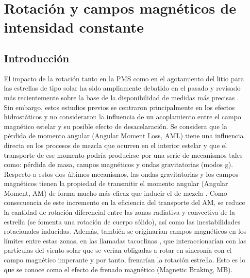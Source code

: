 
\chapter{Rotación y campos magnéticos de intensidad constante}\label{ch:tercer-capitulo}

\section{Introducción}

El impacto de la rotación tanto en la PMS como en el agotamiento del litio para las estrellas de tipo solar ha sido ampliamente debatido en el pasado \citep{Pinsonneault1997,Jeffries2004,Somers2014} y revisado más recientemente sobre la base de la disponibilidad de medidas más precisas \citep{Bouvier2016}. Sin embargo, estos estudios previos se centraron principalmente en los efectos hidrostáticos y no consideraron la influencia de un acoplamiento entre el campo magnético estelar y su posible efecto de desacelaración. Se considera que la pérdida de momento angular (Angular Moment Loss, AML) tiene una influencia directa en los procesos de mezcla que ocurren en el interior estelar y que el transporte de ese momento podría producirse por una serie de mecanismos tales como: pérdida de masa, campos magnéticos y ondas gravitatorias (modos g). Respecto a estos dos últimos mecanismos, las ondas gravitatorias \citep{Charbonnel2005, Pincon2016} y los campos magnéticos \citep{Eggenberger2009} tienen la propiedad de transmitir el momento angular (Angular Moment, AM) de forma mucho más eficaz que inducir el de mezcla \citep{Denissenkov2007}. Como consecuencia de este incremento en la eficiencia del transporte del AM, se reduce la cantidad de rotación diferencial entre las zonas radiativa y convectiva de la estrella (se fomenta una rotación de cuerpo sólido), así como las inestabilidades rotacionales inducidas. Además, también se originarían campos magnéticos en los límites entre estas zonas, en las llamadas tacoclinas \citep{Aschwanden2014, Guerrero2016}, que interaccionarían con las partículas del viento solar que se verían obligadas a rotar en sincronía con el campo magnético imperante y por tanto, frenarían la rotación estrella. Esto es lo que se conoce como el efecto de frenado magnético (Magnetic Braking, MB). \par

